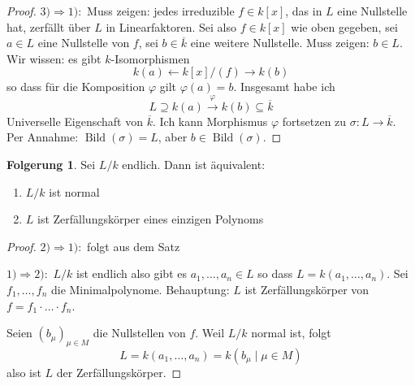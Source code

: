 \documentclass[12pt,parskip=full]{scrartcl}
\newcommand{\heading}{\underline}
\theoremstyle{definition}
\newtheorem{corollary}[theorem]{Folgerung}
\theoremstyle{remark}
\begin{document}
\begin{proof}
		\heading{$3) \Rightarrow 1):$} Muss zeigen: jedes irreduzible $f \in k[x]$, das in $L$ eine Nullstelle hat, zerfällt über $L$ in Linearfaktoren. Sei also $f \in k[x]$ wie oben gegeben, sei $a \in L$ eine Nullstelle von $f$, sei $b \in \overline{k}$ eine weitere Nullstelle. Muss zeigen: $b \in L$. Wir wissen: es gibt $k$-Isomorphismen
		\begin{equation*}
			k(a) \longleftarrow k[x]/(f) \longrightarrow k(b)
		\end{equation*}
		so dass für die Komposition $\varphi$ gilt $\varphi(a) = b$. Insgesamt habe ich
		\begin{equation*}
			L \supseteq k(a) \overset{\varphi}{\longrightarrow} k(b) \subseteq \overline{k}
		\end{equation*}
		Universelle Eigenschaft von $\overline{k}$. Ich kann Morphismus $\varphi$ fortsetzen zu $\sigma: L \to \overline{k}$. Per Annahme: $\operatorname{Bild}(\sigma) = L$, aber $b \in \operatorname{Bild}(\sigma)$.
	\end{proof}

	\begin{corollary}
		Sei $L/k$ endlich. Dann ist äquivalent:
		\begin{enumerate}
			\item $L/k$ ist normal
			\item $L$ ist Zerfällungskörper eines einzigen Polynoms
		\end{enumerate}
	\end{corollary}

	\begin{proof}
		\heading{$2) \Rightarrow 1):$} folgt aus dem Satz
		
		\heading{$1) \Rightarrow 2):$} $L/k$ ist endlich also gibt es $a_1, \dots, a_n \in L$ so dass $L = k(a_1, \dots, a_n)$. Sei $f_1, \dots, f_n$ die Minimalpolynome. Behauptung: $L$ ist Zerfällungskörper von $f = f_1 \cdot \ldots \cdot f_n$.
		
		Seien $(b_\mu)_{\mu \in M}$ die Nullstellen von $f$. Weil $L/k$ normal ist, folgt
		\begin{equation*}
			L = k(a_1, \dots, a_n) = k(b_\mu \mid \mu \in M)
		\end{equation*}
		also ist $L$ der Zerfällungskörper.
	\end{proof}
\end{document}
